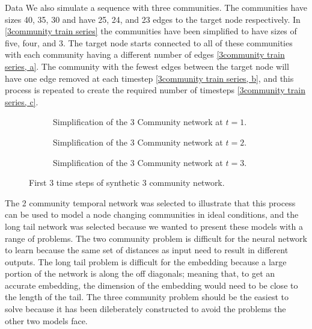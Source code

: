 \documentclass[12pt]{amsart}
\begin{document}
\begin{section}{Data}
    We also simulate a sequence with three communities. The communities have sizes 40, 35, 30 and have 25, 24, and 23 edges to the target node respectively. In \autoref{3community train series} the communities have been simplified to have sizes of five, four, and 3. The target node starts connected to all of these communities with each community having a different number of edges \autoref{3community train series, a}. The community with the fewest edges between the target node will have one edge removed at each timestep \autoref{3community train series, b}, and this process is repeated to create the required number of timesteps \autoref{3community train series, c}.  
    \begin{figure}[H]
        \centering
        \centering
        \begin{subfigure}[c]{0.3\textwidth}
            \centering
            \resizebox{.6\width}{!}{}
            \caption{Simplification of the 3 Community network at $t=1$.}
            \label{3community train series, a}
        \end{subfigure}
        \hfill
        \centering
        \begin{subfigure}[c]{0.3\textwidth}
            \centering
            \resizebox{.6\width}{!}{}
            \caption{Simplification of the 3 Community network at $t=2$.}
            \label{3community train series, b}            
        \end{subfigure}
        \hfill
        \centering
        \begin{subfigure}[c]{0.3\textwidth}
            \centering
            \resizebox{.6\width}{!}{}
            \caption{Simplification of the 3 Community network at $t=3$.}
            \label{3community train series, c}
        \end{subfigure}
        \caption{First 3 time steps of synthetic 3 community network.}
        \label{3community train series}
    \end{figure}
    The 2 community temporal network was selected to illustrate that this process can be used to model a node changing communities in ideal conditions, and the long tail network was selected because we wanted to present these models with a range of problems. The two community problem is difficult for the neural network to learn because the same set of distances as input need to result in different outputs. The long tail problem is difficult for the embedding because a large portion of the network is along the off diagonals; meaning that, to get an accurate embedding, the dimension of the embedding would need to be close to the length of the tail. The three community problem should be the easiest to solve because it has been dileberately constructed to avoid the problems the other two models face.

\end{section}
\end{document}
